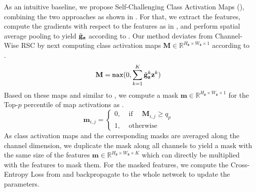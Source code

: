 As an intuitive baseline, we propose Self-Challenging Class Activation Maps (\scam), combining the two approaches as shown in . For that, we extract the features, compute the gradients with respect to the features as in , and perform spatial average pooling to yield $\Tilde{\mathbf{g}}_\mathbf{z}$ according to . Our method deviates from Channel-Wise RSC by next computing class activation maps $\mathbf{M} \in \mathbb{R}^{H_\mathbf{z} \times W_\mathbf{z} \times 1}$ according to .
\begin{equation}
    \mathbf{M} = \mathtt{max}(0,\sum_{k=1}^K\Tilde{\mathbf{g}}_\mathbf{z}^k \mathbf{z}^k)
    \label{eq:Map}
\end{equation}
Based on these maps and similar to , we compute a mask $\mathbf{m} \in \mathbb{R}^{H_\mathbf{z} \times W_\mathbf{z} \times 1}$ for the Top-$p$ percentile of map activations as . 
\begin{equation}
\mathbf{m}_{i,j}=\left\{\begin{array}{ll}
0, & \text { if } \quad \mathbf{M}_{i,j} \geq q_{p} \\
1, & \text { otherwise }
\end{array}\right.
\label{eq:MaskMap}
\end{equation}
As class activation maps and the corresponding masks are averaged along the channel dimension, we duplicate the mask along all channels to yield a mask with the same size of the features $\mathbf{m} \in \mathbb{R}^{H_\mathbf{z} \times W_\mathbf{z} \times K}$ which can directly be multiplied with the features to mask them. For the masked features, we compute the Cross-Entropy Loss from  and backpropagate to the whole network to update the parameters.

